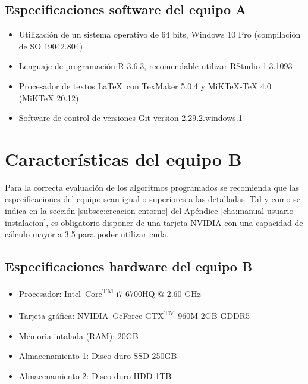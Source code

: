 \subsection{Especificaciones software del equipo A}
\label{subsec:especificaciones-software-equipoa}
\begin{itemize}
    \item Utilización de un sistema operativo de 64 bits, Windows 10 Pro (compilación de SO 19042.804)
    \item Lenguaje de programación R 3.6.3, recomendable utilizar RStudio 1.3.1093
    \item Procesador de textos \LaTeX\ con TexMaker 5.0.4 y MiKTeX-TeX 4.0 (MiKTeX 20.12)
    \item Software de control de versiones Git version 2.29.2.windows.1
\end{itemize}

\section{Características del equipo B}
\label{sec:caracteristicas-segun-equipob}

Para la correcta evaluación de los algoritmos programados se recomienda que las especificaciones del equipo sean igual o superiores a las detalladas. Tal y como se indica en la sección \ref{subsec:creacion-entorno} del Apéndice \ref{cha:manual-usuario-instalacion}, es obligatorio disponer de una tarjeta NVIDIA con una capacidad de cálculo mayor a 3.5 para poder utilizar \gls{cuda}.

\subsection{Especificaciones hardware del equipo B}
\label{subsec:especificaciones-hardware-equipob}

\begin{itemize}
    \item Procesador: Intel\textregistered\ Core\textsuperscript{TM} i7-6700HQ @ 2.60 GHz
    \item Tarjeta gráfica: NVIDIA\textregistered\ GeForce GTX\textsuperscript{TM} 960M 2GB GDDR5
    \item Memoria intalada (RAM): 20GB
    \item Almacenamiento 1: Disco duro SSD 250GB
    \item Almacenamiento 2: Disco duro HDD 1TB
\end{itemize}

